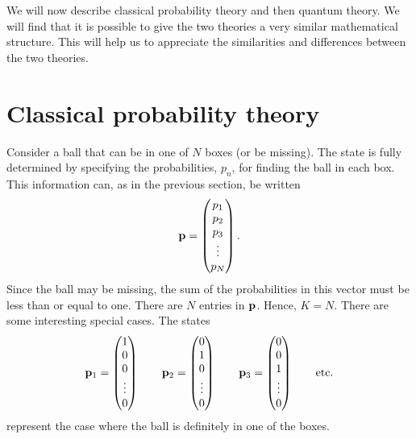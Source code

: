 \documentclass[10pt]{article}
\begin{document}
We will now describe classical probability theory and then quantum
theory.  We will find that it is possible to give the two theories a
very similar mathematical structure.  This will help us to appreciate the
similarities and differences between the two theories.

\section{Classical probability theory}

Consider a ball that can be in one of $N$ boxes (or be missing).  The
state is fully determined by specifying the probabilities, $p_n$, for
finding the ball in each box.  This information can, as in the previous
section, be written
\begin{equation}
  {\bf p} = \left(
  \begin{matrix} p_1 \\ p_2 \\ p_3 \\ \vdots \\ p_N \end{matrix}
  \right).
\end{equation}
Since the ball may be missing, the sum of the probabilities in this
vector must be less than or equal to one.  There are $N$ entries in
${\bf p}$. Hence, $K=N$.  There are some interesting special cases.  The
states
\begin{equation}
{\bf p}_1= \left(
\begin{matrix} 1 \\ 0 \\ 0 \\ \vdots \\ 0 \end{matrix} \right) \qquad
{\bf p}_2= \left(
\begin{matrix} 0 \\ 1 \\ 0 \\ \vdots \\ 0 \end{matrix} \right) \qquad
{\bf p}_3= \left(
\begin{matrix} 0 \\ 0 \\ 1 \\ \vdots \\ 0 \end{matrix} \right) \qquad
{\rm etc.}
\end{equation}
represent the case where the ball is definitely in one of the boxes.
\end{document}
